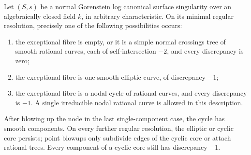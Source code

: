 
\begin{lemma}
\label{D:Gorenstein-lc-configurations}
Let $(S,s)$ be a normal Gorenstein log canonical surface singularity
over an algebraically closed field $k$, in arbitrary characteristic.
On its minimal regular resolution, precisely one of the following
possibilities occurs:
\begin{enumerate}
\item the exceptional fibre is empty, or it is a simple normal
crossings tree of smooth rational curves, each of self-intersection
$-2$, and every discrepancy is zero;
\item the exceptional fibre is one smooth elliptic curve, of
discrepancy $-1$;
\item the exceptional fibre is a nodal cycle of rational curves,
and every discrepancy is $-1$.  A single irreducible nodal rational
curve is allowed in this description.
\end{enumerate}
After blowing up the node in the last single-component case, the
cycle has smooth components.  On every further regular resolution,
the elliptic or cyclic core persists; point blowups only subdivide
edges of the cyclic core or attach rational trees.  Every component
of a cyclic core still has discrepancy $-1$.
\end{lemma}
